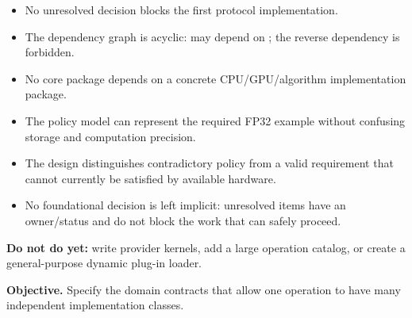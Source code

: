 \exitcriteria
\begin{itemize}
  \item No unresolved decision blocks the first protocol implementation.
  \item The dependency graph is acyclic: \IPP{} may depend on \GEP{}; the reverse dependency is forbidden.
  \item No core package depends on a concrete CPU/GPU/algorithm implementation package.
  \item The policy model can represent the required FP32 example without confusing storage and computation precision.
  \item The design distinguishes contradictory policy from a valid requirement that cannot currently be satisfied by available hardware.
  \item No foundational decision is left implicit: unresolved items have an owner/status and do not block the work that can safely proceed.
\end{itemize}

\textbf{Do not do yet:} write provider kernels, add a large operation catalog, or create a general-purpose dynamic plug-in loader.


\textbf{Objective.} Specify the domain contracts that allow one operation to have many independent implementation classes.

